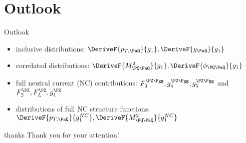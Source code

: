 \section{Outlook}
\begin{frame}{Outlook}
\begin{itemize}
\item inclusive distributions: $\DeriveF{{p_{T,\PaQ}}}{g_1},\DeriveF{{y_{\PaQ}}}{g_1}$
\item correlated distributions: $\DeriveF{{M_{\PQ\PaQ}^2}}{g_1}, \DeriveF{\phi_{\PQ\PaQ}}{g_1}$
\item full neutral current (NC) contributions: $F_3^{\PZ\Pgg}, g_4^{\PZ\Pgg}, g_5^{\PZ\Pgg}$ and $F_2^{\PZ}, F_L^{\PZ}, g_1^{\PZ}$
\item distributions of full NC structure functions: $\DeriveF{p_{T,\PaQ}}{g_1^{NC}},\DeriveF{{M_{\PQ\PaQ}^2}}{g_1^{NC}}$
\end{itemize}

\vspace{1cm}
\begin{beamercolorbox}[ht=2.5ex,dp=1ex,center]{thanks}
Thank you for your attention!
\end{beamercolorbox}
\end{frame}
